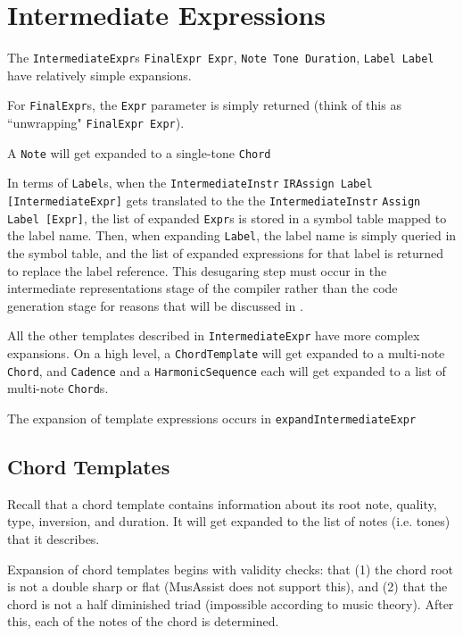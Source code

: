 \documentclass{report}
\begin{document}
\section{Intermediate Expressions}
\label{sec:irexpr}

The \verb.IntermediateExpr.s \verb.FinalExpr Expr., \verb.Note Tone Duration., \verb.Label Label. have relatively simple expansions. 

For \verb.FinalExpr.s, the \verb.Expr. parameter is simply returned (think of this as ``unwrapping" \verb.FinalExpr Expr.). 

A \verb.Note. will get expanded to a single-tone \verb.Chord.

In terms of \verb.Label.s, when the \verb.IntermediateInstr. \verb.IRAssign Label [IntermediateExpr]. gets translated to the the \verb.IntermediateInstr. \verb.Assign Label [Expr]., the list of expanded \verb.Expr.s is stored in a symbol table mapped to the label name. Then, when expanding \verb.Label., the label name is simply queried in the symbol table, and the list of expanded expressions for that label is returned to replace the label reference. This desugaring step must occur in the intermediate representations stage of the compiler rather than the code generation stage for reasons that will be discussed in .

All the other templates described in \verb.IntermediateExpr. have more complex expansions. On a high level, a \verb.ChordTemplate. will get expanded to a multi-note \verb.Chord., and \verb.Cadence. and a \verb.HarmonicSequence. each will get expanded to a list of multi-note \verb.Chord.s.

The expansion of template expressions occurs in \verb.expandIntermediateExpr.

\subsection{Chord Templates}
\label{sec:chordtemplates}
Recall that a chord template contains information about its root note, quality, type, inversion, and duration. It will get expanded to the list of notes (i.e. tones) that it describes.

Expansion of chord templates begins with validity checks: that (1) the chord root is not a double sharp or flat (MusAssist does not support this), and (2) that the chord is not a half diminished triad (impossible according to music theory). After this, each of the notes of the chord is determined.
\end{document}

